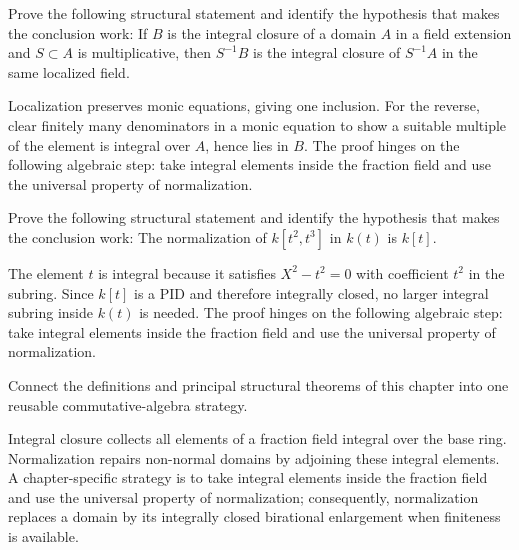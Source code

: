 \begin{problem}\label{prob:v20-problem-10}
Prove the following structural statement and identify the hypothesis that makes the conclusion work: If $B$ is the integral closure of a domain $A$ in a field extension and $S\subset A$ is multiplicative, then $S^{-1}B$ is the integral closure of $S^{-1}A$ in the same localized field.
\end{problem}
\begin{solution}
Localization preserves monic equations, giving one inclusion. For the reverse, clear finitely many denominators in a monic equation to show a suitable multiple of the element is integral over $A$, hence lies in $B$. The proof hinges on the following algebraic step: take integral elements inside the fraction field and use the universal property of normalization.
\end{solution}

\begin{problem}\label{prob:v20-problem-11}
Prove the following structural statement and identify the hypothesis that makes the conclusion work: The normalization of $k[t^2,t^3]$ in $k(t)$ is $k[t]$.
\end{problem}
\begin{solution}
The element $t$ is integral because it satisfies $X^2-t^2=0$ with coefficient $t^2$ in the subring. Since $k[t]$ is a PID and therefore integrally closed, no larger integral subring inside $k(t)$ is needed. The proof hinges on the following algebraic step: take integral elements inside the fraction field and use the universal property of normalization.
\end{solution}

\begin{problem}\label{prob:v20-problem-12}
Connect the definitions and principal structural theorems of this chapter into one reusable commutative-algebra strategy.
\end{problem}
\begin{solution}
Integral closure collects all elements of a fraction field integral over the base ring. Normalization repairs non-normal domains by adjoining these integral elements. A chapter-specific strategy is to take integral elements inside the fraction field and use the universal property of normalization; consequently, normalization replaces a domain by its integrally closed birational enlargement when finiteness is available.
\end{solution}

